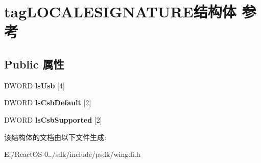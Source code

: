 \hypertarget{structtag_l_o_c_a_l_e_s_i_g_n_a_t_u_r_e}{}\section{tag\+L\+O\+C\+A\+L\+E\+S\+I\+G\+N\+A\+T\+U\+R\+E结构体 参考}
\label{structtag_l_o_c_a_l_e_s_i_g_n_a_t_u_r_e}
\subsection*{Public 属性}
\begin{DoxyCompactItemize}
\item 
\mbox{\label{structtag_l_o_c_a_l_e_s_i_g_n_a_t_u_r_e_acf36107b0123e88a7ff91626318dbf45}} 
D\+W\+O\+RD {\bfseries ls\+Usb} \mbox{[}4\mbox{]}
\item 
\mbox{\label{structtag_l_o_c_a_l_e_s_i_g_n_a_t_u_r_e_a9be85c7e3b79a3bf00af4724724036b8}} 
D\+W\+O\+RD {\bfseries ls\+Csb\+Default} \mbox{[}2\mbox{]}
\item 
\mbox{\label{structtag_l_o_c_a_l_e_s_i_g_n_a_t_u_r_e_a63e89e32ae7a270f9ea558b8f2a3b5f8}} 
D\+W\+O\+RD {\bfseries ls\+Csb\+Supported} \mbox{[}2\mbox{]}
\end{DoxyCompactItemize}


该结构体的文档由以下文件生成\+:\begin{DoxyCompactItemize}
\item 
E\+:/\+React\+O\+S-\/0../sdk/include/psdk/wingdi.\+h\end{DoxyCompactItemize}
